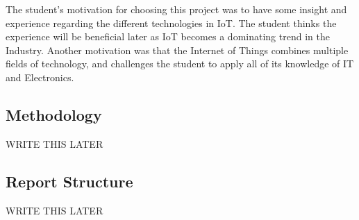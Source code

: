 The student's motivation for choosing this project was to have some insight and experience regarding the different technologies in IoT. The student thinks the experience will be beneficial later as IoT becomes a dominating trend in the Industry. Another motivation was that the Internet of Things combines multiple fields of technology, and challenges the student to apply all of its knowledge of IT and Electronics.
\newpage

\subsection{Methodology}
WRITE THIS LATER
\subsection{Report Structure}

WRITE THIS LATER 